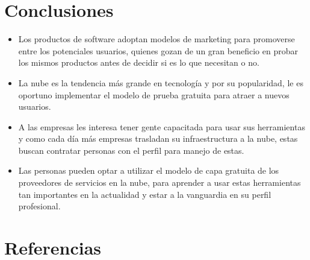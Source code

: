 \documentclass[12pt,spanish,Letterpaper,openany]{book}
\providecommand{\tightlist}{%
  \setlength{\itemsep}{0pt}\setlength{\parskip}{0pt}}
\newcommand{\spaceonemilis}{\vspace{1mm}}
\begin{document}
\hypertarget{conclusiones-9}{%
\section*{Conclusiones}\label{conclusiones-9}}

\begin{itemize}
\tightlist
\item
  Los productos de software adoptan modelos de marketing para promoverse entre los potenciales usuarios, quienes gozan de un gran beneficio en probar los mismos productos antes de decidir si es lo que necesitan o no.
\end{itemize}

\spaceonemilis

\begin{itemize}
\tightlist
\item
  La nube es la tendencia más grande en tecnología y por su popularidad, le es oportuno implementar el modelo de prueba gratuita para atraer a nuevos usuarios.
\end{itemize}

\spaceonemilis

\begin{itemize}
\tightlist
\item
  A las empresas les interesa tener gente capacitada para usar sus herramientas y como cada día más empresas trasladan su infraestructura a la nube, estas buscan contratar personas con el perfil para manejo de estas.
\end{itemize}

\spaceonemilis

\begin{itemize}
\tightlist
\item
  Las personas pueden optar a utilizar el modelo de capa gratuita de los proveedores de servicios en la nube, para aprender a usar estas herramientas tan importantes en la actualidad y estar a la vanguardia en su perfil profesional.
\end{itemize}

\hypertarget{referencias-9}{%
\section*{Referencias}\label{referencias-9}}
\end{document}
